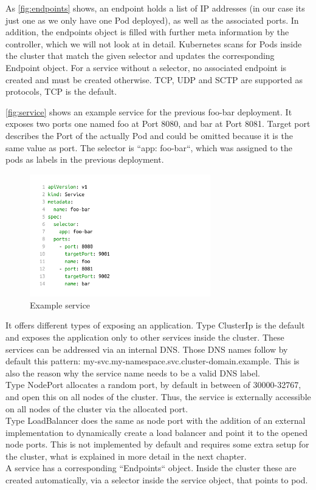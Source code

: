 As \autoref{fig:endpoints} shows, an endpoint holds a list of IP addresses (in our case its just one as we only have one Pod deployed), as well as the associated ports.
In addition, the endpoints object is filled with further meta information by the controller, which we will not look at in detail.
Kubernetes scans for Pods inside the cluster that match the given selector and updates the corresponding Endpoint object.
For a service without a selector, no associated endpoint is created and must be created otherwise.
TCP, UDP and SCTP are supported as protocols, TCP is the default.

\autoref{fig:service} shows an example service for the previous foo-bar deployment.
It exposes two ports one named foo at Port 8080, and bar at Port 8081.
Target port describes the Port of the actually Pod and could be omitted because it is the same value as port.
The selector is ``app: foo-bar``, which was assigned to the pods as labels in the previous deployment.

\begin{figure}[H]
    \centering
    \includegraphics[width=0.7\textwidth, left]{media/02/service}
    \caption{Example service}
    \label{fig:service}
\end{figure}


It offers different types of exposing an application.
Type ClusterIp is the default and exposes the application only to other services inside the cluster.
These services can be addressed via an internal DNS.
Those DNS names follow by default this pattern: my-svc.my-namespace.svc.cluster-domain.example.
This is also the reason why the service name needs to be a valid DNS label.
\\
Type NodePort allocates a random port, by default in between of 30000-32767, and open this on all nodes of the cluster.
Thus, the service is externally accessible on all nodes of the cluster via the allocated port.
\\
Type LoadBalancer does the same as node port with the addition of an external implementation to dynamically create a load balancer and point it to the opened node ports.
This is not implemented by default and requires some extra setup for the cluster, what is explained in more detail in the next chapter.
\\
A service has a corresponding ``Endpoints`` object.
Inside the cluster these are created automatically, via a selector inside the service object, that points to pod.
